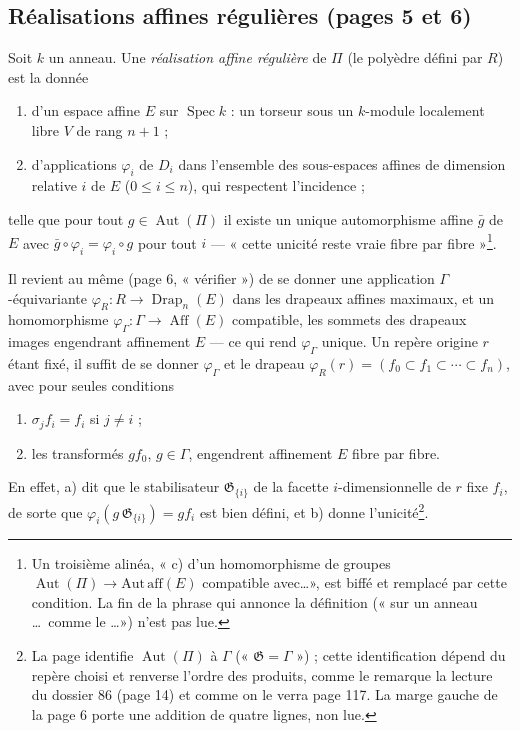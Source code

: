 \documentclass[11pt,a4paper]{article}
\begin{document}
\subsection*{Réalisations affines régulières (pages 5 et 6)}

Soit $k$ un anneau. Une \emph{réalisation affine régulière} de $\Pi$ (le
polyèdre défini par $R$) est la donnée
\begin{enumerate}
  \item[a)] d'un espace affine $E$ sur $\operatorname{Spec} k$ : un torseur
    sous un $k$-module localement libre $V$ de rang $n+1$ ;
  \item[b)] d'applications $\varphi_i$ de $D_i$ dans l'ensemble des
    sous-espaces affines de dimension relative $i$ de $E$ ($0 \leq i \leq n$),
    qui respectent l'incidence ;
\end{enumerate}
telle que pour tout $g \in \operatorname{Aut}(\Pi)$ il existe un unique
automorphisme affine $\bar g$ de $E$ avec $\bar g \circ \varphi_i = \varphi_i
\circ g$ pour tout $i$ --- « cette unicité reste vraie fibre par
fibre »\footnote{Un troisième alinéa, « c) d'un homomorphisme de groupes
$\operatorname{Aut}(\Pi) \to \mathrm{Aut\,aff}(E)$ compatible avec\ldots »,
est biffé et remplacé par cette condition. La fin de la phrase qui annonce la
définition (« sur un anneau \ldots\ comme le \ldots ») n'est pas lue.}.

Il revient au même (page 6, « vérifier ») de se donner une application
$\Gamma$-équivariante $\varphi_R : R \to \operatorname{Drap}_n(E)$ dans les
drapeaux affines maximaux, et un homomorphisme $\varphi_\Gamma : \Gamma \to
\operatorname{Aff}(E)$ compatible, les sommets des drapeaux images engendrant
affinement $E$ --- ce qui rend $\varphi_\Gamma$ unique. Un repère origine $r$
étant fixé, il suffit de se donner $\varphi_\Gamma$ et le drapeau
$\varphi_R(r) = (f_0 \subset f_1 \subset \cdots \subset f_n)$, avec pour
seules conditions
\begin{enumerate}
  \item[a)] $\sigma_j f_i = f_i$ si $j \neq i$ ;
  \item[b)] les transformés $g f_0$, $g \in \Gamma$, engendrent affinement $E$
    fibre par fibre.
\end{enumerate}
En effet, a) dit que le stabilisateur $\mathfrak{G}_{\{i\}}$ de la facette
$i$-dimensionnelle de $r$ fixe $f_i$, de sorte que $\varphi_i(g\,\mathfrak{G}_{\{i\}})
= g f_i$ est bien défini, et b) donne l'unicité\footnote{La page identifie
$\operatorname{Aut}(\Pi)$ à $\Gamma$ (« $\mathfrak{G} = \Gamma$ ») ; cette
identification dépend du repère choisi et renverse l'ordre des produits, comme
le remarque la lecture du dossier 86 (page 14) et comme on le verra page 117.
La marge gauche de la page 6 porte une addition de quatre lignes, non lue.}.
\end{document}
